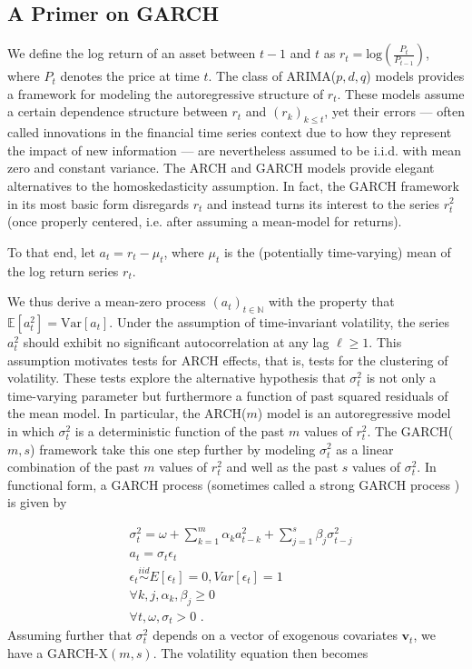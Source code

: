 \documentclass{uiucthesis2021}
\newcommand{\x}{\textbf{v}}
\newcommand{\simiid}{\stackrel{iid}{\sim}} %
\def\mrm#1{\mathrm{#1}} %
\def\E{\mathbb{E}} %
\theoremstyle{definition}
\begin{document}
  \subsection{A Primer on GARCH}
We define the log return of an asset between $t-1$ and $t$ as $r_{t} = \text{log}(\frac{P_{t}}{P_{t-1}})$, where $P_{t}$ denotes the price at time $t$.  The class of ARIMA($p,d,q$) models  \parencite[][]{box2013box} provides a framework for modeling the autoregressive structure of $r_{t}$.  These models assume a certain dependence structure between $r_{t}$ and $(r_{k})_{k\leq t}$, yet their errors --- often called innovations in the financial time series context due to how they represent the impact of new information --- are nevertheless assumed to be i.i.d. with mean zero and constant variance.  The ARCH \parencite[][]{engle1982autoregressive} and GARCH \parencite[][]{bollerslev1986generalized} models provide elegant alternatives to the homoskedasticity assumption.  In fact, the GARCH framework in its most basic form disregards $r_{t}$ and instead turns its interest to the series $r_{t}^{2}$ (once properly centered, i.e. after assuming a mean-model for returns).  

To that end, let $a_{t} = r_{t} - \mu_{t}$, where $\mu_{t}$ is the (potentially time-varying) mean of the log return series $r_{t}$.  

We thus derive a mean-zero process $(a_{t})_{t\in\mathbb{N}}$ with the property that $\E[a^{2}_{t}] = \mrm{Var}[a_{t}]$.  Under the assumption of time-invariant volatility, the series $a_{t}^{2}$ should exhibit no significant autocorrelation at any lag $\ell\geq1$.  This assumption motivates tests for ARCH effects, that is, tests for the clustering of volatility.  These tests explore the alternative hypothesis that $\sigma_{t}^{2}$ is not only a time-varying parameter but furthermore a function of past squared residuals of the mean model.  In particular, the ARCH($m$) model is an autoregressive model in which $\sigma_{t}^{2}$ is a deterministic function of the past $m$ values of $r_{t}^{2}$.  The GARCH($m,s$) framework take this one step further by modeling $\sigma_{t}^{2}$ as a linear combination of the past $m$ values of $r_{t}^{2}$ and well as the past $s$ values of $\sigma_{t}^{2}$.  In functional form, a GARCH process (sometimes called a strong GARCH process \parencite[][p. 19]{francq2019garch}) is given by

\begin{align*}
&\sigma_{t}^{2} = \omega + \sum^{m}_{k=1}\alpha_{k}a^{2}_{t-k} + \sum_{j=1}^{s}\beta_{j}\sigma_{t-j}^{2}\\
&a_{t} = \sigma_{t}\epsilon_{t}\\
&\epsilon_{t} \simiid E[\epsilon_{t}]=0, Var[\epsilon_{t}] = 1\\
&\forall k,j, \alpha_{k},\beta_{j}\geq 0\\ 
&\forall t, \omega, \sigma_{t} > 0 \text { .} 
\end{align*}
Assuming further that $\sigma^{2}_{t}$ depends on a vector of exogenous covariates $\x_{t}$, we have a  GARCH-X$(m,s)$.  The volatility equation then becomes 
\end{document}
